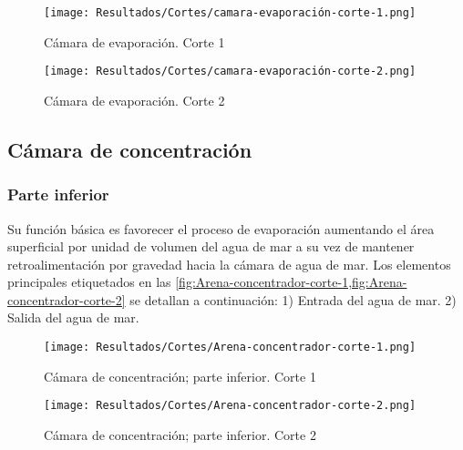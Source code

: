			\begin{figure}[H]
				\centering
				\texttt{[image: Resultados/Cortes/camara-evaporación-corte-1.png]}
				\caption{Cámara de evaporación. Corte 1}
				\label{fig:camara-evaporación-corte-1}
			\end{figure}
			
			\begin{figure}[H]
				\centering
				\texttt{[image: Resultados/Cortes/camara-evaporación-corte-2.png]}
				\caption{Cámara de evaporación. Corte 2}
				\label{fig:camara-evaporación-corte-2}
			\end{figure}
			
		\subsection{Cámara de concentración}
			
			\subsubsection{Parte inferior}
				
				Su función básica es favorecer el proceso de evaporación aumentando el área superficial por unidad de volumen del agua de mar a su vez de mantener retroalimentación por gravedad hacia la cámara de agua de mar. Los elementos principales etiquetados en las \cref{fig:Arena-concentrador-corte-1,fig:Arena-concentrador-corte-2} se detallan a continuación: 1) Entrada del agua de mar. 2) Salida del agua de mar.
			
				\begin{figure}[H]
					\centering
					\texttt{[image: Resultados/Cortes/Arena-concentrador-corte-1.png]}
					\caption{Cámara de concentración; parte inferior. Corte 1}
					\label{fig:Arena-concentrador-corte-1}
				\end{figure}
				
				\begin{figure}[H]
					\centering
					\texttt{[image: Resultados/Cortes/Arena-concentrador-corte-2.png]}
					\caption{Cámara de concentración; parte inferior. Corte 2}
					\label{fig:Arena-concentrador-corte-2}
				\end{figure}
			
